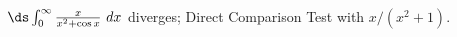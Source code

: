 {$\ds \int_{0}^\infty \frac{x}{x^2+\cos x} \ dx$}
{diverges; Direct Comparison Test with $x/(x^2+1)$.}

